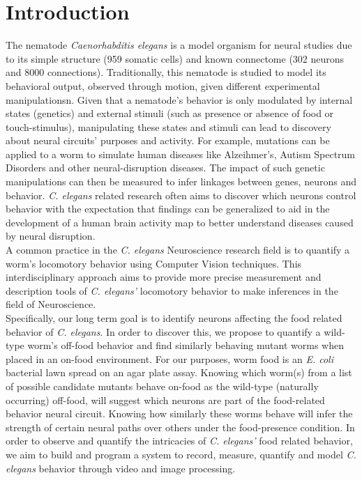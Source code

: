 \documentclass[main.tex]{subfiles}
\begin{document}
\section{Introduction}
The nematode \textit{Caenorhabditis elegans} is a model organism for neural studies due to its simple structure (959 somatic cells) and known connectome (302 neurons and 8000 connections). Traditionally, this nematode is studied to model its behavioral output, observed through motion, given different experimental manipulationsn. Given that a nematode's behavior is only modulated by internal states (genetics) and external stimuli (such as presence or absence of food or touch-stimulus), manipulating these states and stimuli can lead to discovery about neural circuits' purposes and activity. For example, mutations can be applied to a worm to simulate human diseases like Alzeihmer's, Autism Spectrum Disorders and other neural-disruption diseases. The impact of such genetic manipulations can then be measured to infer linkages between genes, neurons and behavior. \textit{C. elegans} related research often aims to discover which neurons control behavior with the expectation that findings can be generalized to aid in the development of a human brain activity map to better understand diseases caused by neural disruption.\\

A common practice in the \textit{C. elegans} Neuroscience research field is to quantify a worm's locomotory behavior using Computer Vision techniques. This interdisciplinary approach aims to provide more precise measurement and description tools of \textit{C. elegans'} locomotory behavior to make inferences in the field of Neuroscience.\\

Specifically, our long term goal is to identify neurons affecting the food related behavior of \textit{C. elegans}. In order to discover this, we propose to quantify a wild-type worm's off-food behavior and find similarly behaving mutant worms when placed in an on-food environment. For our purposes, worm food is an \textit{E. coli} bacterial lawn spread on an agar plate assay. Knowing which worm(s) from a list of possible candidate mutants behave on-food as the wild-type (naturally occurring) off-food, will suggest which neurons are part of the food-related behavior neural circuit. Knowing how similarly these worms behave will infer the strength of certain neural paths over others under the food-presence condition. In order to observe and quantify the intricacies of \textit{C. elegans'} food related behavior, we aim to build and program a system to record, measure, quantify and model \textit{C. elegans} behavior through video and image processing. \\
\end{document}
